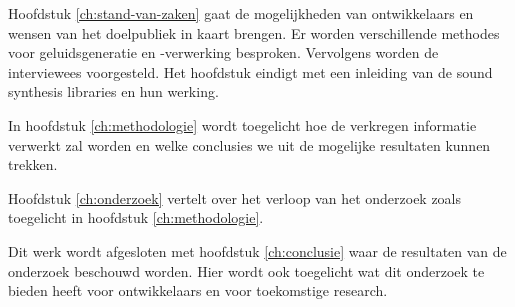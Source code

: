 Hoofdstuk \ref{ch:stand-van-zaken} gaat de mogelijkheden van ontwikkelaars en wensen van het doelpubliek in kaart brengen. Er worden verschillende methodes voor geluidsgeneratie en -verwerking besproken. Vervolgens worden de interviewees voorgesteld. Het hoofdstuk eindigt met een inleiding van de sound synthesis libraries en hun werking.

In hoofdstuk \ref{ch:methodologie} wordt toegelicht hoe de verkregen informatie verwerkt zal worden en welke conclusies we uit de mogelijke resultaten kunnen trekken.

Hoofdstuk \ref{ch:onderzoek} vertelt over het verloop van het onderzoek zoals toegelicht in hoofdstuk \ref{ch:methodologie}.

Dit werk wordt afgesloten met hoofdstuk \ref{ch:conclusie} waar de resultaten van de onderzoek beschouwd worden. Hier wordt ook toegelicht wat dit onderzoek te bieden heeft voor ontwikkelaars en voor toekomstige research.